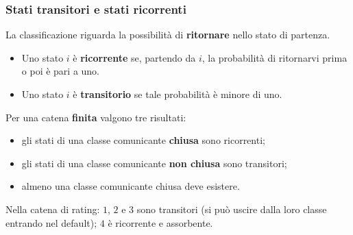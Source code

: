 \documentclass[handout]{beamer}%
\newenvironment{stepitemize}{\begin{itemize}[<+->]}{\end{itemize} }
\providecommand{\QTR}[2]{\csname #1\endcsname{#2}}
\begin{document}
\begin{frame}%
%

\frametitle{Stati transitori e stati ricorrenti}%
%

%


La classificazione riguarda la possibilit\`{a} di \textbf{ritornare} nello
stato di partenza.

\medskip

\begin{stepitemize}
\item Uno stato $i$ \`{e} \textbf{ricorrente} se, partendo da $i$, la
probabilit\`{a} di ritornarvi prima o poi \`{e} pari a uno.

\item Uno stato $i$ \`{e} \textbf{transitorio} se tale probabilit\`{a} \`{e}
minore di uno.
\end{stepitemize}

\medskip

Per una catena \textbf{finita} valgono tre risultati:

\begin{stepitemize}
\item gli stati di una classe comunicante \textbf{chiusa} sono ricorrenti;

\item gli stati di una classe comunicante \textbf{non chiusa} sono transitori;

\item almeno una classe comunicante chiusa deve esistere.
\end{stepitemize}

\medskip

\begin{center}
{\small Nella catena di rating: $1$, $2$ e $3$ sono transitori (si pu\`{o}
uscire dalla loro classe entrando nel default); $4$ \`{e} ricorrente e
assorbente.}
\end{center}%

\transboxout
\end{frame}%
\end{document}

